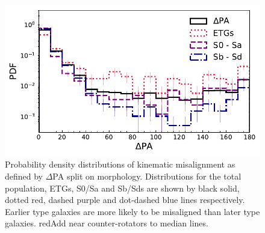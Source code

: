 \documentclass[fleqn,usenatbib]{mnras}
\begin{document}
\begin{figure}
	\includegraphics[width=\linewidth]{morph/delPA_morph.pdf}
    \caption{Probability density distributions of kinematic misalignment as defined by $\Delta$PA split on morphology. Distributions for the total population, ETGs, S0/Sa and Sb/Sds are shown by black solid, dotted red, dashed purple and dot-dashed blue lines respectively. Earlier type galaxies are more likely to be misaligned than later type galaxies. red{Add near counter-rotators to median lines.}}
    \label{fig:morph_PA}
\end{figure}
\end{document}
